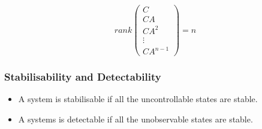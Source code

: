 \[rank \begin{pmatrix}
C       \\
CA      \\
CA^{2}  \\
\vdots  \\
CA^{n-1}
\end{pmatrix} 
= n
\]

\subsubsection{Stabilisability and Detectability}
\begin{itemize}
    \item A system is stabilisable if all the uncontrollable states are stable.
    
    \item A systems is detectable if all the unobservable states are stable.
\end{itemize}
